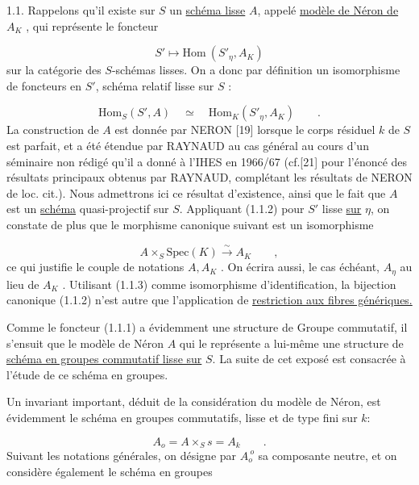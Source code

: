 1.1. Rappelons qu'il existe sur $S$ un \underline{schéma lisse} $A$, appelé \underline{modèle de Néron de} $A_K$ , qui représente le foncteur

\begin{equation}\tag{1.1.1}
S' \longmapsto \mathrm{Hom}\ (S'_\eta,A_K)
\end{equation}
sur la catégorie des $S$-schémas lisses. On a donc par définition un isomorphisme de foncteurs en $S'$, schéma relatif lisse sur $S$ :

\begin{equation}\tag{1.1.2}
\mathrm{Hom}_S(S',A) \quad \simeq \quad \mathrm{Hom}_K(S'_\eta,A_K) \qquad .
\end{equation}
La construction de $A$ est donnée par NERON [19] lorsque le corps résiduel $k$ de $S$ est parfait, et a été étendue par RAYNAUD au cas général au cours d'un séminaire non rédigé qu'il a donné à l'IHES en 1966/67 (cf.[21] pour l'énoncé des résultats principaux obtenus par RAYNAUD, complétant les résultats de NERON de loc. cit.). Nous admettrons ici ce résultat d'existence, ainsi que le fait que $A$ est un \underline{schéma} quasi-projectif sur $S$. Appliquant (1.1.2) pour $S'$ lisse \underline{sur} $\eta$, on constate de plus que le morphisme canonique suivant est un isomorphisme

\begin{equation}\tag{1.1.3}
A \times_S \mathrm{Spec}(K) \xrightarrow{\ \sim\ } A_K \qquad ,
\end{equation}
ce qui justifie le couple de notations $A,A_K$ . On écrira aussi, le cas échéant, $A_\eta$ au lieu de $A_K$ . Utilisant (1.1.3) comme isomorphisme d'identification, la bijection canonique (1.1.2) n'est autre que l'application de \underline{restriction aux fibres génériques.}

Comme le foncteur (1.1.1) a évidemment une structure de Groupe commutatif, il s'ensuit que le modèle de Néron $A$ qui le représente a lui-même une structure de \underline{schéma en groupes commutatif lisse sur} $S$. La suite de cet exposé est consacrée à l'étude de ce schéma en groupes.



Un invariant important, déduit de la considération du modèle de Néron, est évidemment le schéma en groupes commutatifs, lisse et de type fini sur $k$:

\begin{equation}\tag{1.1.4}
A_o = A \times_S s = A_k \qquad .
\end{equation}
Suivant les notations générales, on désigne par $A_o^{\ o}$ sa composante neutre, et on considère également le schéma en groupes


